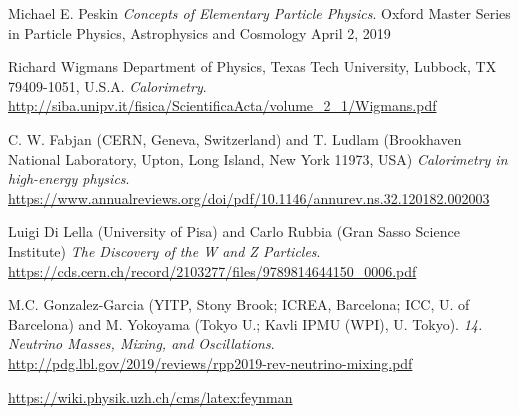 
\cleardoublepage
{}
\begin{thebibliography}{99}

Michael E. Peskin
\textit{Concepts of Elementary Particle Physics}.
Oxford Master Series in Particle Physics, Astrophysics and Cosmology
April 2, 2019

Richard Wigmans
Department of Physics, Texas Tech University, Lubbock, TX 79409-1051, U.S.A.
\textit{Calorimetry}.
\url{http://siba.unipv.it/fisica/ScientificaActa/volume_2_1/Wigmans.pdf}

C. W. Fabjan (CERN, Geneva, Switzerland) and T. Ludlam (Brookhaven National Laboratory, Upton, Long Island, New York 11973, USA)
\textit{Calorimetry in high-energy physics}.
\url{https://www.annualreviews.org/doi/pdf/10.1146/annurev.ns.32.120182.002003}

Luigi Di Lella (University of Pisa) and Carlo Rubbia (Gran Sasso Science Institute)
\textit{The Discovery of the W and Z Particles}.
\url{https://cds.cern.ch/record/2103277/files/9789814644150_0006.pdf}

M.C. Gonzalez-Garcia (YITP, Stony Brook; ICREA, Barcelona; ICC, U. of Barcelona) and M. Yokoyama (Tokyo U.; Kavli IPMU (WPI), U. Tokyo).
\textit{14. Neutrino Masses, Mixing, and Oscillations}.
\url{http://pdg.lbl.gov/2019/reviews/rpp2019-rev-neutrino-mixing.pdf}

\url{https://wiki.physik.uzh.ch/cms/latex:feynman}

\end{thebibliography}
